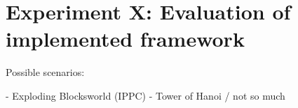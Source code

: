 \section{Experiment X: Evaluation of implemented framework}\label{sec:ExpX}
Possible scenarios:

- Exploding Blocksworld (IPPC) \cite{martinez2017relational}
- Tower of Hanoi \cite{asai2017classical} / not so much

